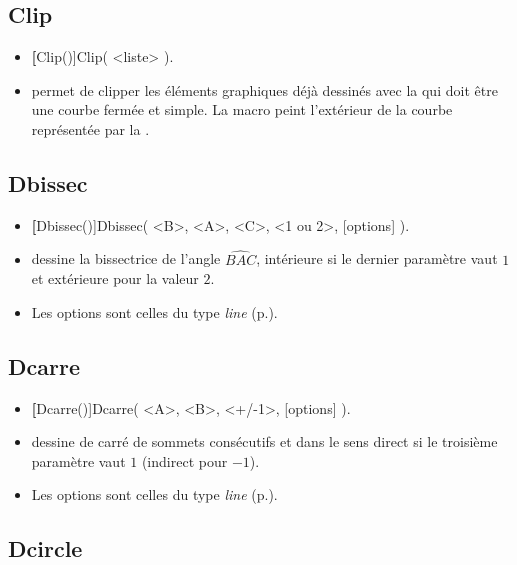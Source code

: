 \subsection{Clip}

\begin{itemize}
 \item \util \textbf[Clip()]{Clip( <liste> )}.
 \item \desc permet de clipper les éléments graphiques déjà dessinés avec la  qui doit être une courbe fermée et simple. La macro peint l'extérieur de la courbe représentée par la .
\end{itemize}

\subsection{Dbissec}

\begin{itemize}
 \item \util \textbf[Dbissec()]{Dbissec( <B>, <A>, <C>, <1 ou 2>, [options] )}.
 \item \desc dessine la bissectrice de l'angle $\widehat{BAC}$, intérieure si le dernier paramètre vaut $1$ et extérieure pour la valeur $2$.
 \item Les options sont celles du type \emph{line} (p.\pageref{typeline}).
\end{itemize} 

\subsection{Dcarre}

\begin{itemize}
 \item \util \textbf[Dcarre()]{Dcarre( <A>, <B>, <+/-1>, [options] )}.
 \item \desc dessine de carré de sommets consécutifs  et  dans le sens direct si le troisième paramètre vaut $1$ (indirect pour $-1$).
 \item Les options sont celles du type \emph{line} (p.\pageref{typeline}).
\end{itemize} 


\subsection{Dcircle}\label{cmdCercle}

